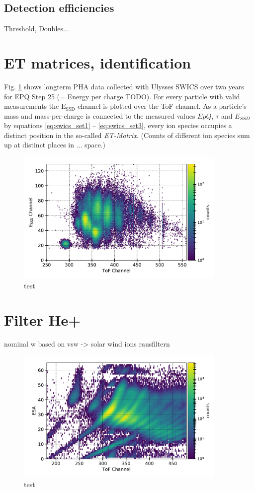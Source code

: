 \subsection{Detection efficiencies}
Threshold, Doubles...



%
%
%

\section{ET matrices, identification}
Fig. \ref{fig:et_matrix} shows longterm PHA data collected with Ulysses SWICS over two years for EPQ Step 25 (= Energy per charge TODO). For every particle with valid measurements the $\mathrm{E_{SSD}}$ channel is plotted over the ToF channel. As a particle's mass and mass-per-charge is connected to the measured values $EpQ$, $\tau$ and $E_{SSD}$ by equations \ref{eq:swics_set1} --  \ref{eq:swics_set3}, every ion species occupies a distinct position in the so-called \textit{ET-Matrix}. (Counts of different ion species sum up at distinct places in ... space.)


\begin{figure}[h]
	\includegraphics[width=0.9\textwidth]{Figures/et_matrix.pdf}
	\centering
	\caption{test}
	\label{fig:et_matrix}
\end{figure}


\section{Filter He+}
nominal w based on vsw -> solar wind ions rausfiltern
\begin{figure}[h]
	\includegraphics[width=0.9\textwidth]{Figures/epq_all.pdf}
	\centering
	\caption{test}
	\label{fig:epq_all}
\end{figure}



